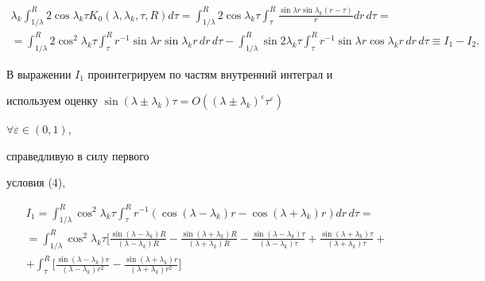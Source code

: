 {\begin{multline}
\lambda_k\int^R_{1/\lambda}2\cos\lambda_k\tau K_0


(\lambda,\lambda_k,\tau,R)d\tau=\int^R_{1/\lambda}


2\cos\lambda_k\tau\int^R_\tau


\frac{\sin\lambda r\sin\lambda_k(r-\tau)}{r}dr\,d\tau=\\


=\int^R_{1/\lambda}2\cos^2\lambda_k\tau\int^R_\tau r^{-1}


\sin\lambda r\sin\lambda_k r\,dr\,d\tau-


\int^R_{1/\lambda}\sin2\lambda_k\tau\int^R_\tau


r^{-1}\sin\lambda r\cos\lambda_k r\,dr\,d\tau


\equiv I_1-I_2.


\end{multline}





В выражении $I_1$ проинтегрируем по частям внутренний интеграл и


используем оценку $\sin(\lambda\pm\lambda_k)\tau=


O((\lambda\pm\lambda_k)^\varepsilon\tau^\varepsilon)$


$\forall\varepsilon\in(0,1)$,


справедливую в силу первого


условия (4),


\begin{multline*}


I_1=\int^R_{1/\lambda}\cos^2\lambda_k\tau


\int^R_\tau r^{-1}(\cos(\lambda-\lambda_k)r-


\cos(\lambda+\lambda_k)r)dr\,d\tau=\\


=\int^R_{1/\lambda}\cos^2\lambda_k\tau\biggl[


\frac{\sin(\lambda-\lambda_k)R}{(\lambda-\lambda_k)R}-


\frac{\sin(\lambda+\lambda_k)R}{(\lambda+\lambda_k)R}-


\frac{\sin(\lambda-\lambda_k)\tau}{(\lambda-\lambda_k)\tau}+


\frac{\sin(\lambda+\lambda_k)\tau}{(\lambda+\lambda_k)\tau}+\\


+\int^R_\tau\biggl[


\frac{\sin(\lambda-\lambda_k)r}{(\lambda-\lambda_k)r^2}-


\frac{\sin(\lambda+\lambda_k)r}{(\lambda+\lambda_k)r^2}\biggr]



\end{multline*}}
